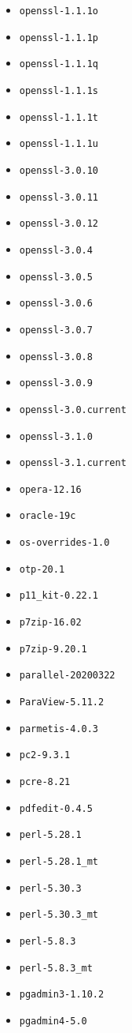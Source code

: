 \begin{multicols}{3}
\begin{itemize}
\item \verb|openssl-1.1.1o|
\item \verb|openssl-1.1.1p|
\item \verb|openssl-1.1.1q|
\item \verb|openssl-1.1.1s|
\item \verb|openssl-1.1.1t|
\item \verb|openssl-1.1.1u|
\item \verb|openssl-3.0.10|
\item \verb|openssl-3.0.11|
\item \verb|openssl-3.0.12|
\item \verb|openssl-3.0.4|
\item \verb|openssl-3.0.5|
\item \verb|openssl-3.0.6|
\item \verb|openssl-3.0.7|
\item \verb|openssl-3.0.8|
\item \verb|openssl-3.0.9|
\item \verb|openssl-3.0.current|
\item \verb|openssl-3.1.0|
\item \verb|openssl-3.1.current|
\item \verb|opera-12.16|
\item \verb|oracle-19c|
\item \verb|os-overrides-1.0|
\item \verb|otp-20.1|
\item \verb|p11_kit-0.22.1|
\item \verb|p7zip-16.02|
\item \verb|p7zip-9.20.1|
\item \verb|parallel-20200322|
\item \verb|ParaView-5.11.2|
\item \verb|parmetis-4.0.3|
\item \verb|pc2-9.3.1|
\item \verb|pcre-8.21|
\item \verb|pdfedit-0.4.5|
\item \verb|perl-5.28.1|
\item \verb|perl-5.28.1_mt|
\item \verb|perl-5.30.3|
\item \verb|perl-5.30.3_mt|
\item \verb|perl-5.8.3|
\item \verb|perl-5.8.3_mt|
\item \verb|pgadmin3-1.10.2|
\item \verb|pgadmin4-5.0|

\end{itemize}
\end{multicols}
